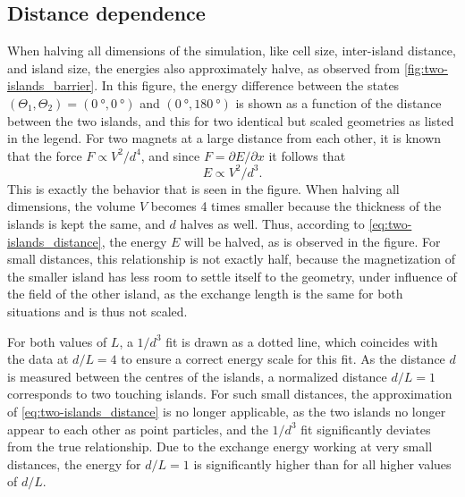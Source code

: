 \documentclass[11pt,a4paper,english]{article}
\begin{document}
\subsection{Distance dependence}
\label{par:TwoIslands_EnergyHeight}
When halving all dimensions of the simulation, like cell size, inter-island distance, and island size, the energies also approximately halve, as observed from \cref{fig:two-islands_barrier}. In this figure, the energy difference between the states $(\Theta_1, \Theta_2) = (\SI{0}{\degree}, \SI{0}{\degree})$ and $(\SI{0}{\degree}, \SI{180}{\degree})$ is shown as a function of the distance between the two islands, and this for two identical but scaled geometries as listed in the legend. For two magnets at a large distance from each other, it is known~\cite{MagnetForceDistance} that the force $F \propto V^2 / d^4$, and since $F=\partial E/\partial x$ it follows that
\begin{equation}
    E \propto V^2 / d^3 \mathrm{.}
    \label{eq:two-islands_distance}
\end{equation}
This is exactly the behavior that is seen in the figure. When halving all dimensions, the volume $V$ becomes 4 times smaller because the thickness of the islands is kept the same, and $d$ halves as well. Thus, according to \cref{eq:two-islands_distance}, the energy $E$ will be halved, as is observed in the figure. For small distances, this relationship is not exactly half, because the magnetization of the smaller island has less room to settle itself to the geometry, under influence of the field of the other island, as the exchange length is the same for both situations and is thus not scaled. \par
For both values of $L$, a $1/d^3$ fit is drawn as a dotted line, which coincides with the data at $d/L=4$ to ensure a correct energy scale for this fit. As the distance $d$ is measured between the centres of the islands, a normalized distance $d/L=1$ corresponds to two touching islands. For such small distances, the approximation of \cref{eq:two-islands_distance} is no longer applicable, as the two islands no longer appear to each other as point particles, and the $1/d^3$ fit significantly deviates from the true relationship. Due to the exchange energy working at very small distances, the energy for $d/L=1$ is significantly higher than for all higher values of $d/L$.
\end{document}
